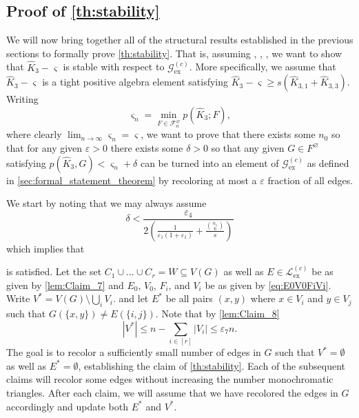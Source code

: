 \documentclass[a4paper,11pt]{article}
\numberwithin{equation}{section}
\newcommand{\mF}{\mathcal{F}}
\newcommand{\mG}{\mathcal{G}}
\newcommand{\mL}{\mathcal{L}}
\newcommand{\boxedchar}[1]{
    \hspace{-2pt}\tikz[baseline=(char.base)]{
        \node[shape=rectangle, fill=black, rounded corners=1.5pt, text=white, inner xsep=3pt, inner xsep=3pt, inner ysep=2pt] (char) {\normalfont #1};
    }\hspace{-2pt}
}
\begin{document}
\subsection{Proof of \cref{th:stability}}\label{sec:remove_error_edges}

We will now bring together all of the structural results established in the previous sections to formally prove \cref{th:stability}. That is, assuming \boxedchar{A1}, \boxedchar{A2}, \boxedchar{A3}, we want to show that $\hat K_3-\varsigma$ is stable with respect to $\mG^{(c)}_{\operatorname{ex}}$.
 More specifically, we assume that $\hat{K}_3 - \varsigma$ is a tight positive algebra element satisfying $\hat{K}_3 - \varsigma \ge s(\hat K_{3,1} + \hat K_{3,3})$. Writing
%
\begin{equation*}
    \varsigma_n = \min_{F \in \mF_n^\varnothing} p(\hat{K}_3; F),
\end{equation*}
%
where clearly $\lim_{n \to \infty} \varsigma_n = \varsigma$, we want to prove that there exists some $n_0$ so that for any given $\varepsilon > 0$ there exists some $\delta>0$ so that any given $G \in F^\varnothing$ satisfying $p(\hat K_3,G) < \varsigma_n + \delta$ can be turned into an element of $\mG^{(c)}_{\operatorname{ex}}$ as defined in \cref{sec:formal_statement_theorem} by recoloring at most a $\varepsilon$ fraction of all edges.

\medskip

We start by noting that we may always assume
%
\begin{equation}\label{eq:beta_upper_bound}
    \delta <
    \frac{\varepsilon_4}
    {2\left(\frac{1}{\varepsilon_1(1+\varepsilon_1)}+\frac{\binom{n_1}{6}}{s}\right)}
\end{equation}
which implies that
\boxedchar{A4} is satisfied. Let the set $C_1\cup \dots \cup C_r=W\subseteq V(G)$ as well as $E\in\mL_{\operatorname{ex}}^{(c)}$ be as given by \cref{lem:Claim_7} and $E_0$, $V_0$, $F_i$, and $V_i$ be as given by \cref{eq:E0V0FiVi}. Write
$
    V^\ast=V(G)\setminus \bigcup_i V_i.    
$
and let $E^\ast$ be all pairs $(x,y)$ where $x\in V_i$ and $y\in V_j$  such 
that $G(\{x,y\})\ne E(\{i,j\})$. Note that by \cref{lem:Claim_8}
%
\begin{equation}
    |V^\ast| \le n - \sum_{i\in [r]}|V_i|\le \varepsilon_7n. \label{eq:Vastupperbnd}
\end{equation}
%
The goal is to recolor a sufficiently small number of edges in $G$ such that $V^\ast = \emptyset$ as well as $E^\ast = \emptyset$, establishing the claim of \cref{th:stability}. Each of the subsequent claims will recolor some edges without increasing the number monochromatic triangles. After each claim,
we will assume that we have recolored the edges in $G$ accordingly and update both $E^\ast$ and $V^\ast$.%
\end{document}
